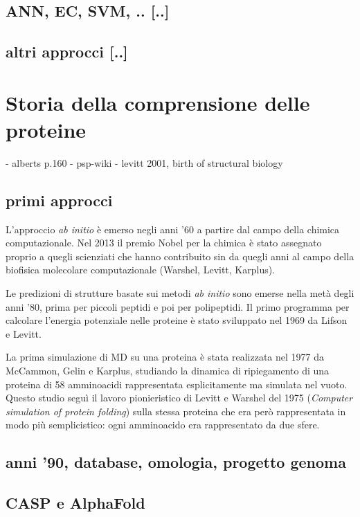 \subsection{ANN, EC, SVM, .. [..]}
\subsection{altri approcci [..]}

\section{Storia della comprensione delle proteine}
- alberts p.160
- psp-wiki
- levitt 2001, birth of structural biology

\subsection{primi approcci}

L'approccio \textit{ab initio} è emerso negli anni '60 a partire dal campo della chimica computazionale. Nel 2013 il premio Nobel per la chimica è stato assegnato proprio a quegli scienziati che hanno contribuito sin da quegli anni al campo della biofisica molecolare computazionale (Warshel, Levitt, Karplus).

\par Le predizioni di strutture basate sui metodi \textit{ab initio} sono emerse nella metà degli anni '80, prima per piccoli peptidi e poi per polipeptidi. Il primo programma per calcolare l'energia potenziale nelle proteine è stato sviluppato nel 1969 da Lifson e Levitt\supercite{levitt1969refinement}.

\par La prima simulazione di MD su una proteina è stata realizzata nel 1977 da McCammon, Gelin e Karplus\supercite{mccammon1977dynamics}, studiando la dinamica di ripiegamento di una proteina di 58 amminoacidi rappresentata esplicitamente ma simulata nel vuoto. Questo studio seguì il lavoro pionieristico di Levitt e Warshel del 1975 (\textit{Computer simulation of protein folding}\supercite{levitt1975computer}) sulla stessa proteina che era però rappresentata in modo più semplicistico: ogni amminoacido era rappresentato da due sfere. 



\subsection{anni '90, database, omologia, progetto genoma}
\subsection{CASP e AlphaFold}

\clearpage
